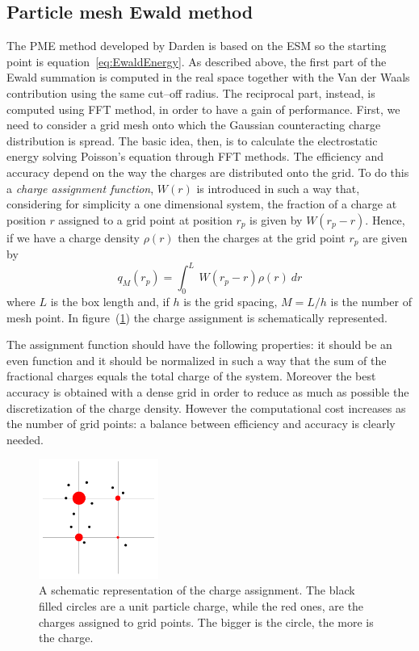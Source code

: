 \subsection{Particle mesh Ewald method}
The \acf{PME} method developed by Darden \etal \cite{DardenPME} is based on the \ac{ESM} so the starting point
is equation~\eqref{eq:EwaldEnergy}. As described above, the first part of the Ewald summation is computed in the
real space together with the Van der Waals contribution using the same cut--off radius. The reciprocal part,
instead, is computed using \ac{FFT} method, in order to have a gain of performance. First, we need to
consider a grid mesh onto which the Gaussian counteracting charge distribution is spread. The basic idea, then,
is to calculate the electrostatic energy solving Poisson's equation through \ac{FFT} methods. The efficiency and
accuracy depend on the way the charges are distributed onto the grid. To do this a \textit{charge assignment
function}, $W(r)$ is introduced in such a way that, considering for simplicity a one dimensional system, the 
fraction of a charge at position $r$ assigned to a grid point at position $r_p$ is given by $W(r_p - r)$. Hence, if 
we have a charge density $\rho(r)$ then the charges at the grid point $r_p$ are given by
\begin{equation}
	q_M(r_p) = \int_0^L\ W(r_p - r) \rho (r)\ dr
	\label{eq:meshAssign}
\end{equation}
where $L$ is the box length and, if $h$ is the grid spacing, $M = L/h$ is the number of mesh point. In
figure~(\ref{fig:gidAssign}) the charge assignment is schematically represented.

The assignment function should have the following properties: it should be an even function and it should be
normalized in such a way that the sum of the fractional charges equals the total charge of the system. Moreover
the best accuracy is obtained with a dense grid in order to reduce as much as possible the discretization of the
charge density. However the computational cost increases as the number of grid points: a balance between
efficiency and accuracy is clearly needed.
\begin{figure}
	\includegraphics[width=0.35\textwidth]{./img/gridCharge/gridCharge}
	\caption{A schematic representation of the charge assignment. The black filled circles are a unit particle charge, while the red ones, are the charges assigned to grid points. The bigger is the circle, the more is the charge.}
	\label{fig:gidAssign}
\end{figure}

